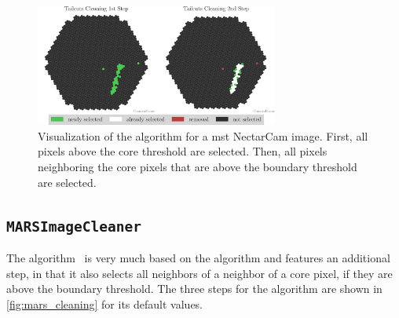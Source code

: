 \begin{figure}
    \centering
    \includegraphics[height=4cm]{plots/cleaner_steps/tailcuts.pdf}
    \caption{Visualization of the \tailcuts{} algorithm for a \gls{mst} NectarCam image. First, all
    pixels above the core threshold are selected. Then, all pixels neighboring the core
    pixels that are above the boundary threshold are selected.}%
    \label{fig:tailcuts_clean}
\end{figure}

\subsection*{\texttt{MARSImageCleaner}}%
\vspace{-0.5cm}
The \mars{} algorithm~\cite{mars} is very much based on the \tailcuts{}
algorithm and features an additional step, in that it also selects all neighbors of a neighbor of a
core pixel, if they are above the boundary threshold. The three steps for the \mars{} algorithm
are shown in \autoref{fig:mars_cleaning} for its default values.

